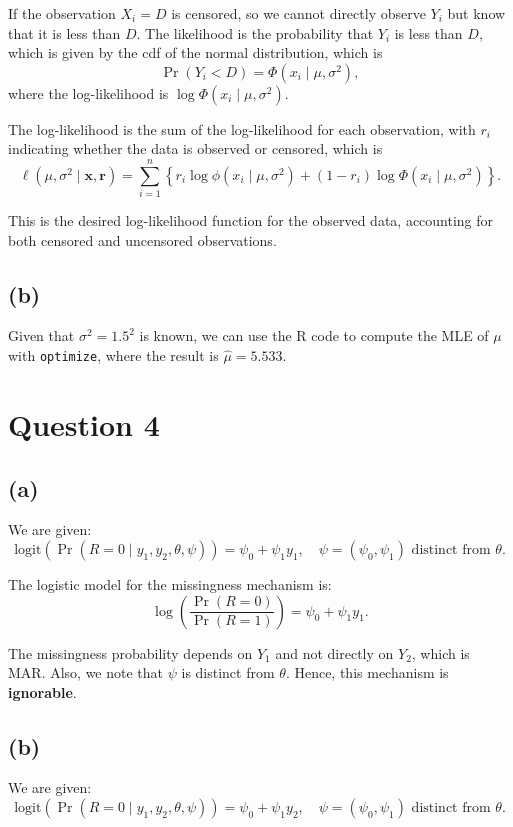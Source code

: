 \documentclass{article}
\begin{document}
If the observation \( X_i = D \) is censored, so we cannot directly observe \( Y_i \) but know that it is less than \( D \). The likelihood is the probability that \( Y_i \) is less than \( D \), which is given by the cdf of the normal distribution, which is
   \[
   \Pr(Y_i < D) = \Phi(x_i \mid \mu, \sigma^2),
   \]
   where the log-likelihood is $\log \Phi(x_i \mid \mu, \sigma^2)$.

The log-likelihood is the sum of the log-likelihood for each observation, with \( r_i \) indicating whether the data is observed or censored, which is
   \[
   \ell(\mu, \sigma^2 \mid \mathbf{x}, \mathbf{r}) = \sum_{i=1}^{n} \left\{ r_i \log \phi(x_i \mid \mu, \sigma^2) + (1 - r_i) \log \Phi(x_i \mid \mu, \sigma^2) \right\}.
   \]

This is the desired log-likelihood function for the observed data, accounting for both censored and uncensored observations.

\newpage

\subsection{(b)}
Given that \(\sigma^2 = 1.5^2\) is known, we can use the R code to compute the MLE of \(\mu\) with \texttt{optimize}, where the result is \(\hat{\mu} = 5.533\).

\newpage

\section{Question 4}
\subsection{(a)}
We are given:
\[
\text{logit}\left(\Pr(R = 0 \mid y_1, y_2, \theta, \psi)\right) = \psi_0 + \psi_1 y_1, \quad \psi = (\psi_0, \psi_1) \text{ distinct from } \theta.
\]
 
The logistic model for the missingness mechanism is:
\[
\log\left(\frac{\Pr(R = 0)}{\Pr(R = 1)}\right) = \psi_0 + \psi_1 y_1.
\]

The missingness probability depends on \(Y_1\) and not directly on \(Y_2\), which is MAR. Also, we note that $\psi$ is distinct from $\theta$. Hence, this mechanism is \textbf{ignorable}.

\newpage

\subsection{(b)}
We are given:
\[
\text{logit}\left(\Pr(R = 0 \mid y_1, y_2, \theta, \psi)\right) = \psi_0 + \psi_1 y_2, \quad \psi = (\psi_0, \psi_1) \text{ distinct from } \theta.
\]
 
\end{document}

